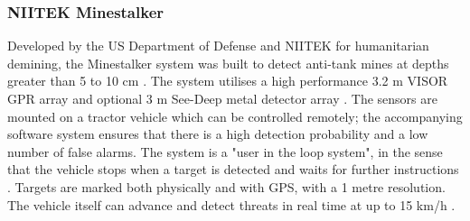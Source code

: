 \documentclass[main.tex]{subfiles}
\begin{document}
\begin{appendices}
\subsubsection*{NIITEK Minestalker} 
Developed by the US Department of Defense and NIITEK for humanitarian demining, the Minestalker system was built to detect anti-tank mines at depths greater than 5 to 10 cm \parencite{laudato2014}. The system utilises a high performance 3.2 m VISOR GPR array and optional 3 m See-Deep metal detector array \parencite{niitek2015}. The sensors are mounted on a tractor vehicle which can be controlled remotely; the accompanying software system ensures that there is a high detection probability and a low number of false alarms. The system is a "user in the loop system", in the sense that the vehicle stops when a target is detected and waits for further instructions \parencite{laudato2014}. Targets are marked both physically and with GPS, with a 1 metre resolution. The vehicle itself can advance and detect threats in real time at up to 15 km/h \parencite{niitek2015}.





\end{appendices}
\end{document}
